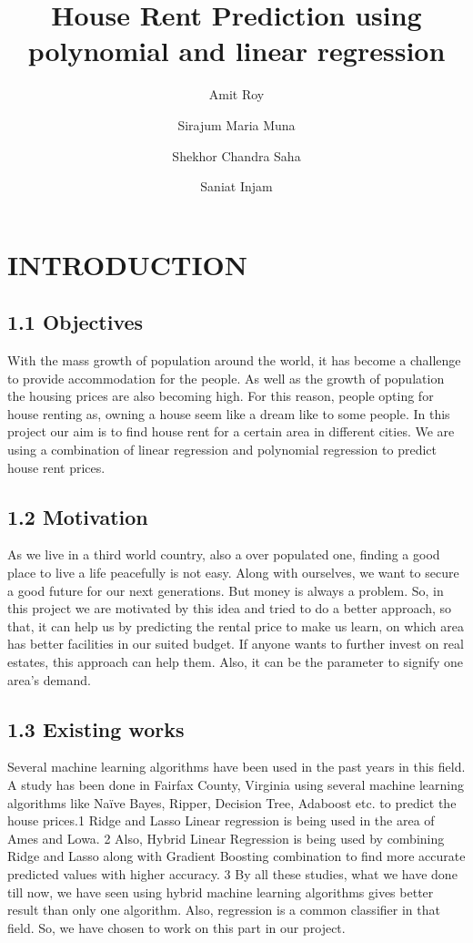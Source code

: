 \documentclass[conference]{IEEEtran}[10]
\begin{document}
\title{House Rent Prediction using polynomial and linear regression}
\author[1]{ Amit Roy
}

\author[2]{ Sirajum Maria Muna
}

\author[3]{ Shekhor Chandra Saha
}

\author[4]{ Saniat Injam
}

\maketitle
\IEEEpubidadjcol
\section{INTRODUCTION}
\subsection{1.1 Objectives}
With the mass growth of population around the world, it has become a challenge to provide accommodation for the people. As well as the growth of population the housing prices are also becoming high. For this reason, people opting for house renting as, owning a house seem like a dream like to some people. In this project our aim is to find house rent for a certain area in different cities. We are using a combination of linear regression and polynomial regression to predict house rent prices. 
\subsection{1.2 Motivation}
As we live in a third world country, also a over populated one, finding a good place to live a life peacefully is not easy. Along with ourselves, we want to secure a good future for our next generations. But money is always a problem. So, in this project we are motivated by this idea and tried to do a better approach, so that, it can help us by predicting the rental price to make us learn, on which area has better facilities in our suited budget. If anyone wants to further invest on real estates, this approach can help them. Also, it can be the parameter to signify one area’s demand.
\subsection*{1.3 Existing works}
Several machine learning algorithms have been used in the past years in this field. A study has been done in Fairfax County, Virginia using several machine learning algorithms like Naïve Bayes, Ripper, Decision Tree, Adaboost etc. to predict the house prices.1
Ridge and Lasso Linear regression is being used in the area of Ames and Lowa. 2
Also, Hybrid Linear Regression is being used by combining Ridge and Lasso along with Gradient Boosting combination to find more accurate predicted values with higher accuracy. 3
By all these studies, what we have done till now, we have seen using hybrid machine learning algorithms gives better result than only one algorithm. Also, regression is a common classifier in that field. So, we have chosen to work on this part in our project.
\end{document}
